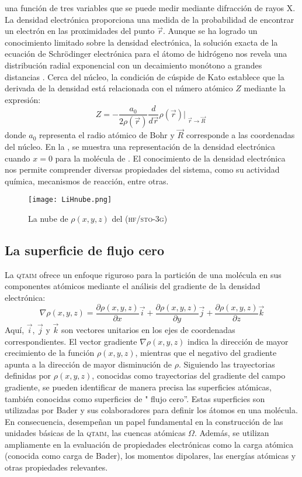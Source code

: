   una función de tres variables que se puede medir mediante difracción de rayos X. La densidad 
	electrónica proporciona una medida de la probabilidad de encontrar un electrón en las proximidades del 
	punto $\vec{r}$. Aunque se ha logrado un conocimiento limitado sobre la densidad electrónica, la solución 
		exacta de la ecuación de Schrödinger electrónica para el átomo de hidrógeno nos revela una distribución radial
		exponencial con un decaimiento monótono a grandes distancias \cite{decayalhrichs} \cite{hoffmannh2}. Cerca del núcleo, 
		la condición de cúspide de Kato \cite{kato57} establece que la derivada de la densidad está relacionada con el número
	   atómico $Z$ mediante la expresión:
	  \begin{equation}
			Z = - \frac{a_0}{2\rho(\vec{r})}
			\frac{d}{d\vec{r}}
			\rho(\vec{r})
			\Biggr|_{\substack{\vec{r} \rightarrow \vec{R}}}
		\end{equation}
	donde $a_0$ representa el radio atómico de Bohr y $\vec{R}$ corresponde a las coordenadas del núcleo. En la , 
	se muestra una representación de la 	densidad electrónica cuando $x=0$ para la molécula de . El conocimiento de 
	la densidad electrónica nos permite comprender diversas propiedades del sistema, como su actividad química, mecanismos de reacción, 
	entre otras.
	\begin{figure} [h!]
		\centering
		\texttt{[image: LiHnube.png]}
		\caption{La nube de $\rho(x,y,z)$ del  (\textsc{hf/sto-3g})}
		\label{fig:LiHnube}
	\end{figure}
	\subsection{La superficie de flujo cero}
	La \textsc{qtaim} ofrece un enfoque riguroso para la partición de una molécula en sus componentes atómicos 
	mediante el análisis del gradiente de la densidad electrónica:
	\begin{equation}
		\nabla \rho(x,y,z) = \frac{\partial \rho(x,y,z)}{\partial x} \vec{i} +
		\frac{\partial \rho(x,y,z)}{\partial y} \vec{j} +
		\frac{\partial \rho(x,y,z)}{\partial z} \vec{k}
	\end{equation}
	Aquí, $\vec{i}$, $\vec{j}$ y $\vec{k}$ son vectores unitarios en los ejes de coordenadas correspondientes. 
	El vector gradiente $\nabla \rho(x,y,z)$ indica la dirección de mayor crecimiento de la función $\rho(x,y,z)$, mientras que el 
	negativo del gradiente apunta a la dirección de mayor disminución de $\rho$. Siguiendo las trayectorias definidas por $\rho(x,y,z)$, 
	conocidas como trayectorias del gradiente del campo gradiente, se pueden identificar de manera precisa las superficies atómicas, 
	también conocidas como superficies de " flujo cero''. Estas superficies son utilizadas por Bader y sus colaboradores para definir los átomos 
	en una molécula. En consecuencia, desempeñan un papel fundamental en la construcción de las unidades básicas de la 
	\textsc{qtaim}, las cuencas atómicas $\Omega$. Además, se utilizan ampliamente en la evaluación de propiedades electrónicas como la
	 carga atómica (conocida como carga de Bader), los momentos dipolares, las energías atómicas y otras propiedades relevantes.
	
